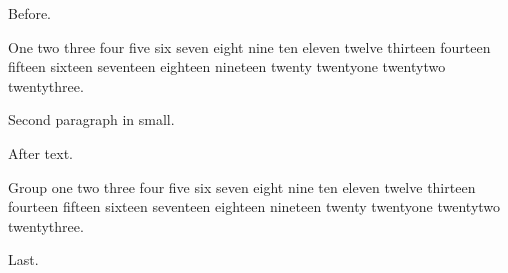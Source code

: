 \documentclass{article}
\begin{document}
Before.

\begin{small}
One two three four five six seven eight nine ten eleven twelve thirteen fourteen fifteen sixteen seventeen eighteen nineteen twenty twentyone twentytwo twentythree.

Second paragraph in small.
\end{small}

After text.

{\small Group one two three four five six seven eight nine ten eleven twelve thirteen fourteen fifteen sixteen seventeen eighteen nineteen twenty twentyone twentytwo twentythree.\par}

Last.
\end{document}
